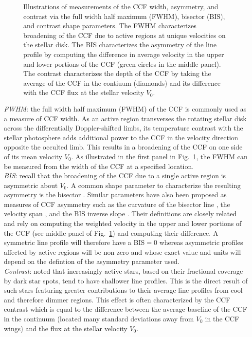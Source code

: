\begin{figure}
  \centering
  \caption[Illustrations of CCF shape parameters.]
          {Illustrations of measurements of the CCF width, asymmetry, and contrast via the full
            width half maximum (FWHM), bisector (BIS), and contrast shape parameters. The FWHM
            characterizes broadening of the CCF due to active regions at unique velocities on the
            stellar disk. The
            BIS characterizes the asymmetry of the line profile by computing the difference in
            average velocity in the upper and lower portions of the CCF (green circles in the
            middle panel). The contrast characterizes the depth of the CCF by taking the average
            of the CCF in the contiuum (diamonds) and its difference with the CCF flux at the
            stellar velocity $V_0$.}
  \label{fig:ccf}
\end{figure}

\emph{FWHM}:
the full width half maximum (FWHM) of the CCF is commonly used as a measure of CCF
width. As an active region transverses the rotating stellar disk across the differentially
Doppler-shifted limbs, its temperature contrast with the stellar photosphere adds additional
power to the CCF in the velocity direction opposite the occulted limb. This results in a
broadening of the CCF on one side of its mean velocity $V_0$. As illustrated in
the first panel in Fig.~\ref{fig:ccf},
the FWHM can be measured from the width of the CCF at a specified location. \\

\emph{BIS}:
recall that the broadening of the CCF due to a single active region is asymmetric about $V_0$.
A common shape parameter to characterize the resulting asymmetry is the bisector
\citep[BIS;][]{queloz01}.
Similar parameters have also been proposed as measures of CCF asymmetry such as the curvature of
the bisector line \citep{hatzes96}, the velocity span \citep{boisse11}, and the BIS inverse
slope \citep{queloz01}. Their definitions are closely related and rely on computing the weighted
velocity in the upper and lower portions of the CCF (see middle panel of Fig.~\ref{fig:ccf})
and computing their difference. A symmetric line profile will therefore have a BIS$=0$ whereas
asymmetric profiles affected by active regions will be non-zero and whose exact value and units
will depend on the defintion of the asymmetry parameter used. \\

\emph{Contrast}:
\citep{boisse09} noted that increasingly active stars, based on their fractional coverage by dark
star spots, tend to have shallower line profiles. This is the direct result of such stars featuring
greater contributions to their average line profiles from cool and therefore dimmer regions.
This effect is often characterized by the CCF contrast which is equal to the difference between the
average baseline of the CCF in the continuum (located many standard deviations away from $V_0$ in
the CCF wings) and the flux at the stellar velocity $V_0$.


